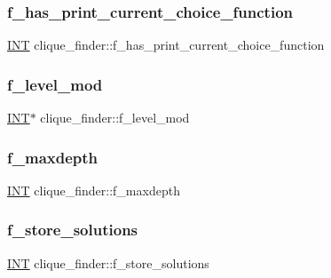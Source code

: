 \subsubsection{\texorpdfstring{f\+\_\+has\+\_\+print\+\_\+current\+\_\+choice\+\_\+function}{f\_has\_print\_current\_choice\_function}}
{\footnotesize\ttfamily \mbox{\hyperlink{galois_8h_a09fddde158a3a20bd2dcadb609de11dc}{I\+NT}} clique\+\_\+finder\+::f\+\_\+has\+\_\+print\+\_\+current\+\_\+choice\+\_\+function}

\mbox{\label{classclique__finder_aa188729a5eba26fb30330c21c7bc3378}} 
\subsubsection{\texorpdfstring{f\+\_\+level\+\_\+mod}{f\_level\_mod}}
{\footnotesize\ttfamily \mbox{\hyperlink{galois_8h_a09fddde158a3a20bd2dcadb609de11dc}{I\+NT}}$\ast$ clique\+\_\+finder\+::f\+\_\+level\+\_\+mod}

\mbox{\label{classclique__finder_ab6f65a19b16d67f85684f95b2db53a55}} 
\subsubsection{\texorpdfstring{f\+\_\+maxdepth}{f\_maxdepth}}
{\footnotesize\ttfamily \mbox{\hyperlink{galois_8h_a09fddde158a3a20bd2dcadb609de11dc}{I\+NT}} clique\+\_\+finder\+::f\+\_\+maxdepth}

\mbox{\label{classclique__finder_a4d633f956e2c3ad167b3ac925f71828f}} 
\subsubsection{\texorpdfstring{f\+\_\+store\+\_\+solutions}{f\_store\_solutions}}
{\footnotesize\ttfamily \mbox{\hyperlink{galois_8h_a09fddde158a3a20bd2dcadb609de11dc}{I\+NT}} clique\+\_\+finder\+::f\+\_\+store\+\_\+solutions}

